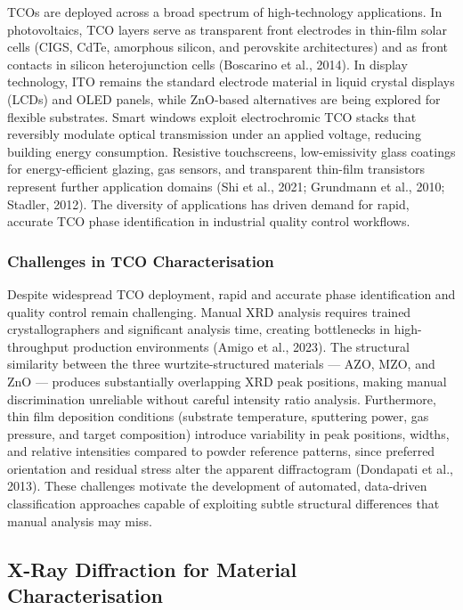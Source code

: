 \documentclass[12pt, oneside]{article} %
\begin{document}
TCOs are deployed across a broad spectrum of high-technology applications. In photovoltaics, TCO layers serve as transparent front electrodes in thin-film solar cells (CIGS, CdTe, amorphous silicon, and perovskite architectures) and as front contacts in silicon heterojunction cells (Boscarino et al., 2014). In display technology, ITO remains the standard electrode material in liquid crystal displays (LCDs) and OLED panels, while ZnO-based alternatives are being explored for flexible substrates. Smart windows exploit electrochromic TCO stacks that reversibly modulate optical transmission under an applied voltage, reducing building energy consumption. Resistive touchscreens, low-emissivity glass coatings for energy-efficient glazing, gas sensors, and transparent thin-film transistors represent further application domains (Shi et al., 2021; Grundmann et al., 2010; Stadler, 2012). The diversity of applications has driven demand for rapid, accurate TCO phase identification in industrial quality control workflows.


\subsubsection{Challenges in TCO Characterisation}

Despite widespread TCO deployment, rapid and accurate phase identification and quality control remain challenging. Manual XRD analysis requires trained crystallographers and significant analysis time, creating bottlenecks in high-throughput production environments (Amigo et al., 2023). The structural similarity between the three wurtzite-structured materials --- AZO, MZO, and ZnO --- produces substantially overlapping XRD peak positions, making manual discrimination unreliable without careful intensity ratio analysis. Furthermore, thin film deposition conditions (substrate temperature, sputtering power, gas pressure, and target composition) introduce variability in peak positions, widths, and relative intensities compared to powder reference patterns, since preferred orientation and residual stress alter the apparent diffractogram (Dondapati et al., 2013). These challenges motivate the development of automated, data-driven classification approaches capable of exploiting subtle structural differences that manual analysis may miss.


\subsection{X-Ray Diffraction for Material Characterisation}
\end{document}
